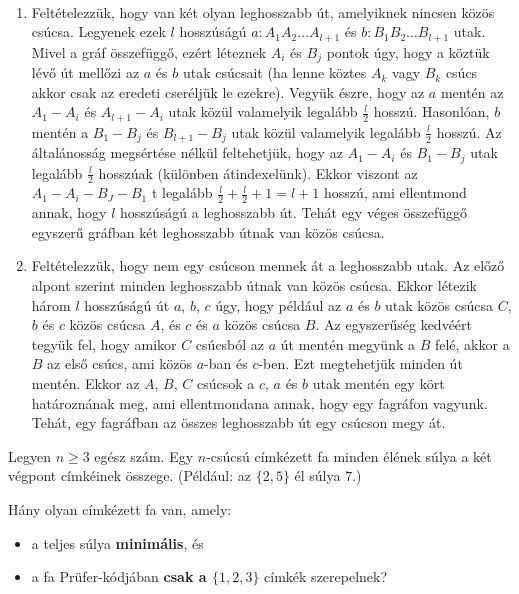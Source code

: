 \begin{solution}
	~
	\begin{enumerate}
		\item Feltételezzük, hogy van két olyan leghosszabb út, amelyiknek nincsen
		közös csúcsa. Legyenek ezek $l$ hosszúságú $a:A_{1}A_{2}\dots A_{l+1}$
		és $b:B_{1}B_{2}\dots B_{l+1}$ utak. Mivel a gráf összefüggő, ezért
		léteznek $A_{i}$ és $B_{j}$ pontok úgy, hogy a köztük lévő út mellőzi
		az $a$ és $b$ utak csúcsait (ha lenne köztes $A_{k}$ vagy $B_{k}$
		csúcs akkor csak az eredeti cseréljük le ezekre). Vegyük észre, hogy
		az $a$ mentén az $A_{1}-A_{i}$ és $A_{l+1}-A_{i}$ utak közül valamelyik
		legalább $\frac{l}{2}$ hosszú. Hasonlóan, $b$ mentén a $B_{1}-B_{j}$
		és $B_{l+1}-B_{j}$ utak közül valamelyik legalább $\frac{l}{2}$
		hosszú. Az általánosság megsértése nélkül feltehetjük, hogy az $A_{1}-A_{i}$
		és $B_{1}-B_{j}$ utak legalább $\frac{l}{2}$ hosszúak (különben
		átindexelünk). Ekkor viszont az $A_{1}-A_{i}-B_{J}-B_{1}$ t legalább
		$\frac{l}{2}+\frac{l}{2}+1=l+1$ hosszú, ami ellentmond annak, hogy
		$l$ hosszúságú a leghosszabb út. Tehát egy véges összefüggő egyszerű
		gráfban két leghosszabb útnak van közös csúcsa. 
		\item Feltételezzük, hogy nem egy csúcson mennek át a leghosszabb utak.
		Az előző alpont szerint minden leghosszabb útnak van közös csúcsa.
		Ekkor létezik három $l$ hosszúságú út $a$, $b$, $c$ úgy, hogy
		például az $a$ és $b$ utak közös csúcsa $C$, $b$ és $c$ közös
		csúcsa $A$, és $c$ és $a$ közös csúcsa $B$. Az egyszerűség kedvéért
		tegyük fel, hogy amikor $C$ csúcsból az $a$ út mentén megyünk a
		$B$ felé, akkor a $B$ az első csúcs, ami közös $a$-ban és $c$-ben.
		Ezt megtehetjük minden út mentén. Ekkor az $A$, $B$, $C$ csúcsok
		a $c$, $a$ és $b$ utak mentén egy kört határoznának meg, ami ellentmondana
		annak, hogy egy fagráfon vagyunk. Tehát, egy fagráfban az összes leghosszabb
		út egy csúcson megy át. 
	\end{enumerate}
\end{solution}
\begin{extraproblem}
	Legyen $n\geq3$ egész szám. Egy $n$-csúcsú címkézett fa minden
	élének súlya a két végpont címkéinek összege. (Például: az $\{2,5\}$
	él súlya $7$.)
	
	Hány olyan címkézett fa van, amely:
	\begin{itemize}
		\item a teljes súlya \textbf{minimális}, és 
		\item a fa Prüfer-kódjában \textbf{csak a $\{1,2,3\}$} címkék szerepelnek? 
	\end{itemize}
\end{extraproblem}

